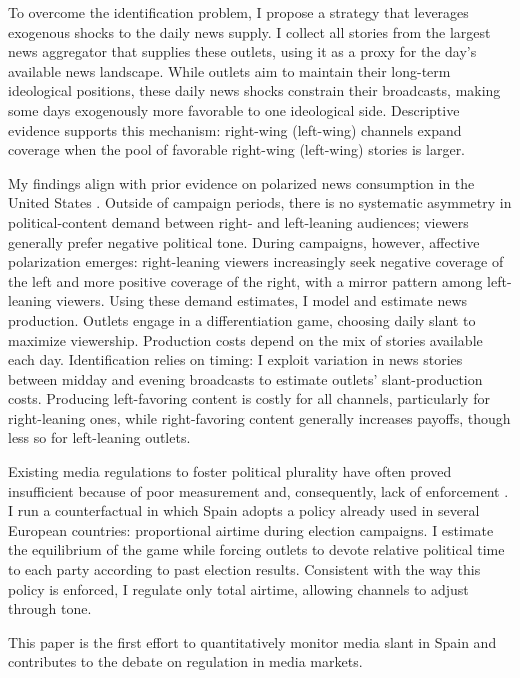 \documentclass[12pt]{article}
\begin{document}
To overcome the identification problem, I propose a strategy that leverages exogenous shocks to the daily news supply. I collect all stories from the largest news aggregator that supplies these outlets, using it as a proxy for the day’s available news landscape. While outlets aim to maintain their long-term ideological positions, these daily news shocks constrain their broadcasts, making some days exogenously more favorable to one ideological side. Descriptive evidence supports this mechanism: right-wing (left-wing) channels expand coverage when the pool of favorable right-wing (left-wing) stories is larger.

My findings align with prior evidence on polarized news consumption in the United States \citep{Peterson2017Echo}. Outside of campaign periods, there is no systematic asymmetry in political-content demand between right- and left-leaning audiences; viewers generally prefer negative political tone. During campaigns, however, affective polarization emerges: right-leaning viewers increasingly seek negative coverage of the left and more positive coverage of the right, with a mirror pattern among left-leaning viewers.
Using these demand estimates, I model and estimate news production. Outlets engage in a differentiation game, choosing daily slant to maximize viewership. Production costs depend on the mix of stories available each day. Identification relies on timing: I exploit variation in news stories between midday and evening broadcasts to estimate outlets’ slant-production costs. Producing left-favoring content is costly for all channels, particularly for right-leaning ones, while right-favoring content generally increases payoffs, though less so for left-leaning outlets.


Existing media regulations to foster political plurality have often proved insufficient because of poor measurement and, consequently, lack of enforcement \citep{cage_assemblee}. I run a counterfactual in which Spain adopts a policy already used in several European countries: proportional airtime during election campaigns. I estimate the equilibrium of the game while forcing outlets to devote relative political time to each party according to past election results. Consistent with the way this policy is enforced, I regulate only total airtime, allowing channels to adjust through tone.

This paper is the first effort to quantitatively monitor media slant in Spain and contributes to the debate on regulation in media markets.
\end{document}
